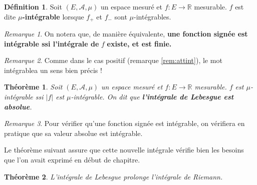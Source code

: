 \documentclass[french]{report}
\theoremstyle{plain}
\newtheorem{thm}{Théorème}[section]
\theoremstyle{definition}
\newtheorem{defi}{Définition}[section]
\theoremstyle{remark}
\newtheorem{rem}{Remarque}[section]
\begin{document}
\begin{defi}
  Soit $\left(E,\mathcal{A},\mu\right)$ un espace mesuré et $f:E\rightarrow\mathbb{R}$ mesurable.
  $f$ est dite $\mu$\textbf{-intégrable} lorsque $f_+$ et $f_-$ sont $\mu$-intégrables.
\end{defi}

\begin{rem}
  On notera que, de manière équivalente, \textbf{une fonction signée est intégrable ssi l'intégrale de} $f$ \textbf{existe, et est finie.}
\end{rem}

\begin{rem}
  Comme dans le cas positif (remarque \ref{rem:attint}), le mot \og intégrable\fg a un sens bien précis !
\end{rem}

\begin{thm}
  Soit $\left(E, \mathcal{A}, \mu\right)$ un espace mesuré et $f:E\longrightarrow\mathbb{R}$ mesurable. $f$ est $\mu$-intégrable ssi $\left|f\right|$ est $\mu$-intégrable.
  On dit que \textbf{l'intégrale de Lebesgue est absolue}.
\end{thm}

\begin{rem}
  Pour vérifier qu'une fonction signée est intégrable, on vérifiera en pratique que sa valeur absolue est intégrable.
\end{rem}

Le théorème suivant assure que cette nouvelle intégrale vérifie bien les besoins que l'on avait exprimé en début de chapitre.

\begin{thm}
  L'intégrale de Lebesgue prolonge l'intégrale de Riemann.
\end{thm}
\end{document}
